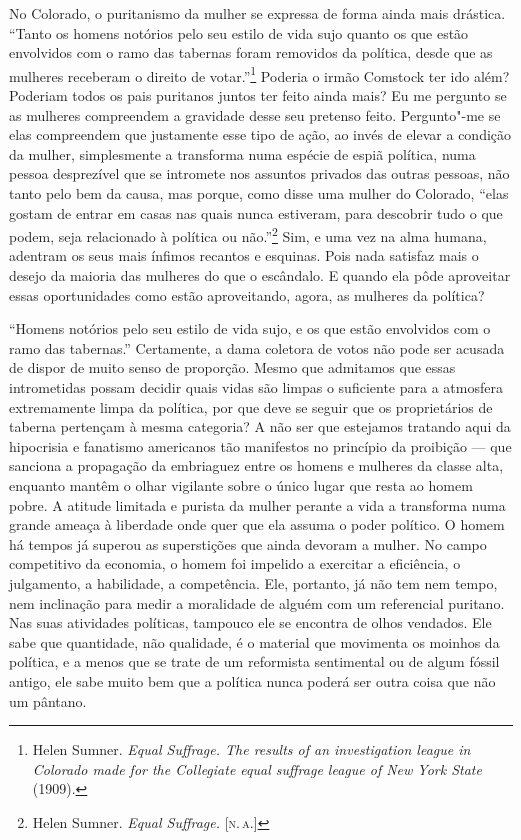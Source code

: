No Colorado, o puritanismo da mulher se expressa de forma ainda mais
drástica. ``Tanto os homens notórios pelo seu estilo de vida sujo
quanto os que estão envolvidos com o ramo das tabernas foram removidos
da política, desde que as mulheres receberam o direito de
votar.''\footnote{Helen Sumner. \textit{Equal Suffrage. The results of an
  investigation league in Colorado made for the Collegiate equal
  suffrage league of New York State} (1909).} Poderia o irmão Comstock
ter ido além? Poderiam todos os pais puritanos juntos ter feito ainda mais? Eu
me pergunto se as mulheres compreendem a gravidade desse seu pretenso
feito. Pergunto"-me se elas compreendem que justamente esse tipo de ação, ao
invés de elevar a condição da mulher, simplesmente a transforma numa
espécie de espiã política, numa pessoa desprezível que se intromete nos
assuntos privados das outras pessoas, não tanto pelo bem da causa, mas
porque, como disse uma mulher do Colorado, ``elas gostam de entrar em
casas nas quais nunca estiveram, para descobrir tudo o que podem, seja
relacionado à política ou não.''\footnote{Helen Sumner. \textit{Equal
  Suffrage.} [\textsc{n.\,a.}]} Sim, e uma vez na alma humana, adentram os seus
mais ínfimos recantos e esquinas. Pois nada satisfaz mais o desejo da maioria das
mulheres do que o escândalo. E quando ela pôde aproveitar essas
oportunidades como estão aproveitando, agora, as mulheres da política?

``Homens notórios pelo seu estilo de vida sujo, e os que estão
envolvidos com o ramo das tabernas.'' Certamente, a dama coletora de
votos não pode ser acusada de dispor de muito senso de proporção. Mesmo
que admitamos que essas intrometidas possam decidir quais vidas são
limpas o suficiente para a atmosfera extremamente limpa da política, por
que deve se seguir que os proprietários de taberna pertençam à mesma
categoria? A não ser que estejamos tratando aqui da hipocrisia e
fanatismo americanos tão manifestos no princípio da proibição
--- que sanciona a propagação da embriaguez entre os
homens e mulheres da classe alta, enquanto mantêm o olhar vigilante
sobre o único lugar que resta ao homem pobre. A atitude limitada e
purista da mulher perante a vida a transforma numa grande ameaça à
liberdade onde quer que ela assuma o poder político. O homem há tempos
já superou as superstições que ainda devoram a mulher. No campo
competitivo da economia, o homem foi impelido a exercitar a eficiência,
o julgamento, a habilidade, a competência. Ele, portanto, já não tem nem
tempo, nem inclinação para medir a moralidade de alguém com um
referencial puritano. Nas suas atividades políticas, tampouco ele se encontra de olhos vendados. Ele sabe que quantidade, não qualidade, é o material
que movimenta os moinhos da política, e a menos que se trate de um
reformista sentimental ou de algum fóssil antigo, ele sabe muito bem que
a política nunca poderá ser outra coisa que não um pântano.

